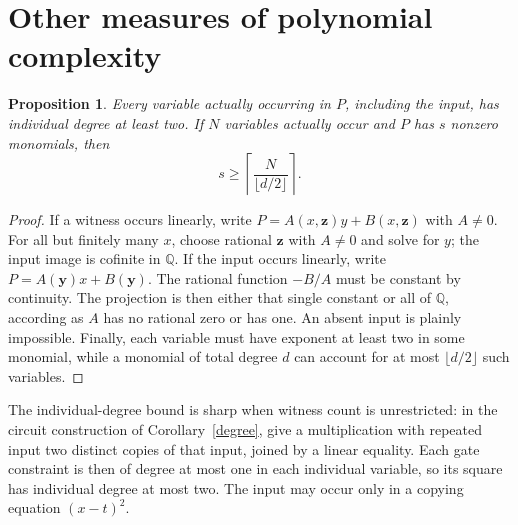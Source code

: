 \documentclass[11pt]{article}
\newtheorem{proposition}[theorem]{Proposition}
\theoremstyle{remark}\newtheorem{remark}[theorem]{Remark}
\newcommand{\Q}{\mathbb Q}\newcommand{\Z}{\mathbb Z}\newcommand{\R}{\mathbb R}
\begin{document}
\section{Other measures of polynomial complexity}

\begin{proposition}\label{partial}
Every variable actually occurring in \(P\), including the input, has individual degree at least two. If \(N\) variables actually occur and \(P\) has \(s\) nonzero monomials, then
\[
 s\ge\left\lceil\frac{N}{\lfloor d/2\rfloor}\right\rceil.
\]
\end{proposition}
\begin{proof}
If a witness occurs linearly, write \(P=A(x,\mathbf z)y+B(x,\mathbf z)\) with \(A\ne0\). For all but finitely many \(x\), choose rational \(\mathbf z\) with \(A\ne0\) and solve for \(y\); the input image is cofinite in \(\Q\). If the input occurs linearly, write \(P=A(\mathbf y)x+B(\mathbf y)\). The rational function \(-B/A\) must be constant by continuity. The projection is then either that single constant or all of \(\Q\), according as \(A\) has no rational zero or has one. An absent input is plainly impossible. Finally, each variable must have exponent at least two in some monomial, while a monomial of total degree \(d\) can account for at most \(\lfloor d/2\rfloor\) such variables.
\end{proof}

The individual-degree bound is sharp when witness count is unrestricted: in the circuit construction of Corollary~\ref{degree}, give a multiplication with repeated input two distinct copies of that input, joined by a linear equality. Each gate constraint is then of degree at most one in each individual variable, so its square has individual degree at most two. The input may occur only in a copying equation \((x-t)^2\).
\end{document}
